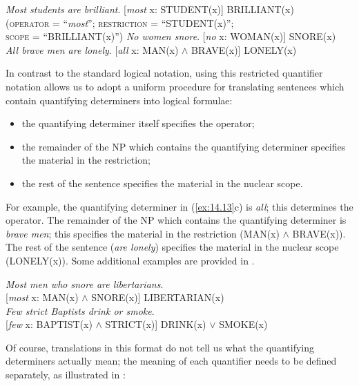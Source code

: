 \ea \label{ex:14.13}
\ea \textit{Most students are brilliant}.  [\textit{most} x: STUDENT(x)] BRILLIANT(x)\\
\hspace{35pt}\textsc{(operator} = “\textit{most}”; \textsc{restriction} = “STUDENT(x)”;\\
\hspace{40pt}\textsc{scope} = “BRILLIANT(x)”)
\ex  \textit{No women snore}.  [\textit{no} x: WOMAN(x)] SNORE(x)\\
\ex \textit{All brave men are lonely}.  [\textit{all} x: MAN(x) $\wedge$ BRAVE(x)] LONELY(x)
\z \z


In contrast to the standard logical notation, using this restricted quantifier notation allows us to adopt a uniform procedure for translating sentences which contain quantifying determiners into logical formulae:


\begin{itemize}
\item the quantifying determiner itself specifies the operator;
\item the remainder of the NP which contains the quantifying determiner specifies the material in the restriction;
\item the rest of the sentence specifies the material in the nuclear scope.
\end{itemize}

For example, the quantifying determiner in (\ref{ex:14.13}c) is \textit{all}; this determines the operator. The remainder of the NP which contains the quantifying determiner is \textit{brave men}; this specifies the material in the restriction (MAN(x) $\wedge$ BRAVE(x)). The rest of the sentence (\textit{are lonely}) specifies the material in the nuclear scope (LONELY(x)). Some additional examples are provided in .


\ea \label{ex:14.14}
\ea  \textit{Most men who snore are libertarians}.\\
  {}[\textit{most} x: MAN(x) $\wedge$ SNORE(x)] LIBERTARIAN(x)\\
\ex \textit{Few strict Baptists drink or smoke}.\\
  {}[\textit{few} x: BAPTIST(x) $\wedge$ STRICT(x)] DRINK(x) $\vee$ SMOKE(x)
                       \z
\z


Of course, translations in this format do not tell us what the quantifying determiners actually mean; the meaning of each quantifier needs to be defined separately, as illustrated in :


